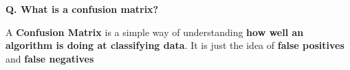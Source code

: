 \begin{frame}[fragile]{\textbf{Q. What is a confusion matrix?}}
  \begin{wideitemize}
  \item A \textbf{Confusion Matrix} is a simple way of understanding \textbf{how well an
      algorithm is doing at classifying data}. It is just the idea of \textbf{false
      positives} and \textbf{false negatives}\vspace{0.5em}
    \begin{flushleft}
    \end{flushleft}
  \end{wideitemize}
\end{frame}

